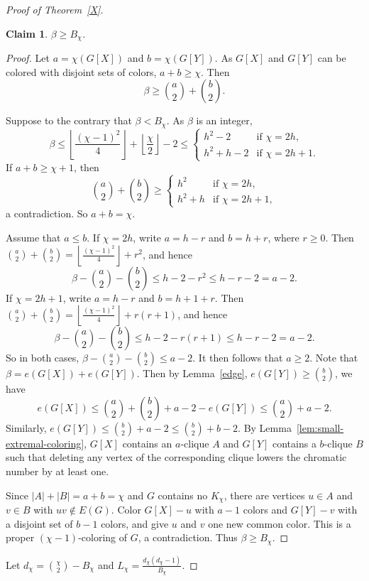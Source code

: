 \documentclass[12pt]{article}
\newtheorem{claim}{Claim}[section]
\begin{document}
\begin{proof}[Proof of Theorem~\ref{X}]
\begin{claim}\label{lem:maxcut-deficiency}
 $\beta\ge B_\chi$.
\end{claim}

\begin{proof}
Let $a=\chi(G[X])$ and $b=\chi(G[Y])$. 
As $G[X]$ and $G[Y]$ can be colored with disjoint sets of colors, $a+b\ge \chi$. Then
\[
\beta\ge\binom a2+\binom b2.
\]

Suppose to the contrary that $\beta<B_\chi$. As $\beta$ is an integer,
\[
\beta\le \left\lfloor\frac{(\chi-1)^2}{4}\right\rfloor
 +\left\lfloor\frac{\chi}{2}\right\rfloor-2\le \begin{cases}
h^2-2 &\text{if }\chi=2h,\\
h^2+h-2 &\text{if }\chi=2h+1.
\end{cases}
\]
If $a+b\ge \chi+1$, then
\[
\binom a2+\binom b2\ge
\begin{cases}
h^2 &\text{if }\chi=2h,\\
h^2+h &\text{if }\chi=2h+1,
\end{cases}
\]
a contradiction. So $a+b=\chi$.

Assume that $a\le b$. 
If $\chi=2h$, write $a=h-r$ and $b=h+r$, where $r\ge0$. Then
$\binom a2+\binom b2=\left\lfloor\frac{(\chi-1)^2}{4}\right\rfloor+r^2$, 
and hence
\[
\beta-\binom a2-\binom b2
 \le h-2-r^2\le h-r-2=a-2.
\]
If $\chi=2h+1$, write $a=h-r$ and $b=h+1+r$. Then
$\binom a2+\binom b2=\left\lfloor\frac{(\chi-1)^2}{4}\right\rfloor+r(r+1)$,
and hence
\[
\beta-\binom a2-\binom b2
 \le h-2-r(r+1)\le h-r-2=a-2.
\]
So in both cases, $\beta-\binom a2-\binom b2\le a-2$.
It then follows that $a\ge2$. 
Note that $\beta=e(G[X])+e(G[Y])$. Then by Lemma~\ref{edge}, $e(G[Y])\ge \binom b2$, we have  \[
e(G[X])\le \binom a2+\binom b2+a-2-e(G[Y])\le \binom a2+a-2.
\]
Similarly, $e(G[Y])\le \binom b2+a-2\le \binom b2 +b-2$. 
By Lemma~\ref{lem:small-extremal-coloring},
$G[X]$ contains an $a$-clique $A$ and $G[Y]$ contains a $b$-clique $B$ such that deleting any vertex of the corresponding clique lowers the chromatic number  by at least one.

Since $|A|+|B|=a+b=\chi$ and $G$ contains no $K_\chi$, there are vertices $u\in A$ and $v\in B$ with
$uv\notin E(G)$. Color $G[X]-u$ with $a-1$ colors and $G[Y]-v$ with a disjoint set of $b-1$ colors,
and give $u$ and $v$ one new common color. This is a proper $(\chi-1)$-coloring of $G$, a contradiction.
Thus $\beta\ge B_\chi$. 
\end{proof}

Let $d_\chi=\binom{\chi}{2}-B_\chi$ and $L_\chi=\frac{d_\chi(d_\chi-1)}{B_\chi}$.


\end{proof}
\end{document}
